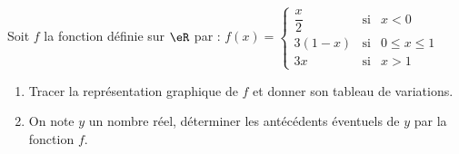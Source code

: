 
\begin{exercice}\label{exoautoanalyseCTU-1}
    Soit $f$ la fonction définie sur $\eR$ par : $f(x) = \left\{\begin{array}{ccc}\dfrac{ x }{2}&\text{si}&x<0\\3(1-x)&\text{si}&0\leqslant x\leqslant 1\\3x&\text{si}&x>1\end{array}\right.$
    \begin{enumerate}
        \item Tracer la représentation graphique de $f$ et donner son tableau de variations.
        \item On note $y$ un nombre réel, déterminer les antécédents éventuels de $y$ par la fonction $f$. 
     \end{enumerate}

\end{exercice}
